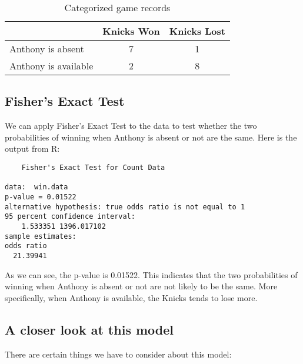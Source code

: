 \documentclass[12pt]{article}
\begin{document}
\begin{table}[ht!]
  \begin{center}
    \begin{tabular}{|l|c|c|}
      \hline
                            & Knicks Won & Knicks Lost  \\ \hline
      Anthony is absent     & 7          & 1            \\ \hline
      Anthony is available  & 2          & 8            \\ \hline
    \end{tabular}
  \end{center}
  \caption{Categorized game records \label{tab:cat}}
\end{table}

\subsection{Fisher's Exact Test}

We can apply Fisher's Exact Test to the data to test whether the
two probabilities of winning when Anthony is absent or not are the
same. Here is the output from R:

\begin{verbatim}
	Fisher's Exact Test for Count Data

data:  win.data 
p-value = 0.01522
alternative hypothesis: true odds ratio is not equal to 1 
95 percent confidence interval:
    1.533351 1396.017102 
sample estimates:
odds ratio 
  21.39941 
\end{verbatim}

As we can see, the p-value is 0.01522. This indicates that the two
probabilities of winning when Anthony is absent or not are not likely
to be the same. More specifically, when Anthony is available, the Knicks
tends to lose more.

\subsection{A closer look at this model}

There are certain things we have to consider about this model:
\end{document}
